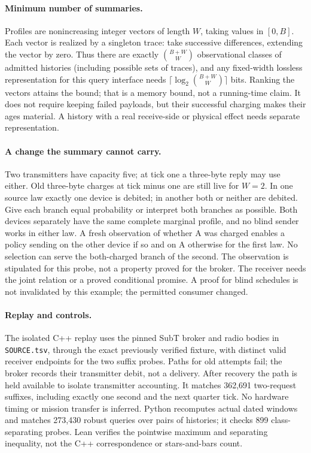 \documentclass{article}
\begin{document}
\paragraph{Minimum number of summaries.}
Profiles are nonincreasing integer vectors of length $W$, taking values in $[0,B]$. Each vector is realized by a singleton trace: take successive differences, extending the vector by zero. Thus there are exactly $\binom{B+W}{W}$ observational classes of admitted histories (including possible sets of traces), and any fixed-width lossless representation for this query interface needs $\lceil\log_2\binom{B+W}{W}\rceil$ bits. Ranking the vectors attains the bound; that is a memory bound, not a running-time claim. It does not require keeping failed payloads, but their successful charging makes their ages material. A history with a real receive-side or physical effect needs separate representation.

\paragraph{A change the summary cannot carry.}
Two transmitters have capacity five; at tick one a three-byte reply may use either. Old three-byte charges at tick minus one are still live for $W=2$. In one source law exactly one device is debited; in another both or neither are debited. Give each branch equal probability or interpret both branches as possible. Both devices separately have the same complete marginal profile, and no blind sender works in either law. A fresh observation of whether A was charged enables a policy sending on the other device if so and on A otherwise for the first law. No selection can serve the both-charged branch of the second. The observation is stipulated for this probe, not a property proved for the broker. The receiver needs the joint relation or a proved conditional promise. A proof for blind schedules is not invalidated by this example; the permitted consumer changed.

\paragraph{Replay and controls.}
The isolated C++ replay uses the pinned SubT broker and radio bodies in \texttt{SOURCE.tsv}, through the exact previously verified fixture, with distinct valid receiver endpoints for the two suffix probes. Paths for old attempts fail; the broker records their transmitter debit, not a delivery. After recovery the path is held available to isolate transmitter accounting. It matches 362,691 two-request suffixes, including exactly one second and the next quarter tick. No hardware timing or mission transfer is inferred. Python recomputes actual dated windows and matches 273,430 robust queries over pairs of histories; it checks 899 class-separating probes. Lean verifies the pointwise maximum and separating inequality, not the C++ correspondence or stars-and-bars count.
\end{document}
